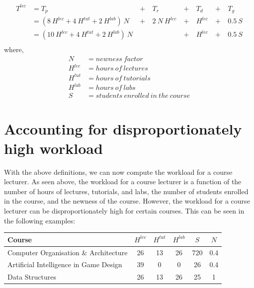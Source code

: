 \begin{equation}
  \begin{aligned}
    T^{lec} & = T_p                                        & \ +\  & T_r            & \ +\  & T_d     & \ +\  & T_g    \\
            & = (8\ H^{lec} + 4\ H^{tut} + 2\ H^{lab})\ N  & \ +\  & 2\ N\  H^{lec} & \ +\  & H^{lec} & \ +\  & 0.5\ S \\
            & = (10\ H^{lec} + 4\ H^{tut} + 2\ H^{lab})\ N &       &                & \ +\  & H^{lec} & \ +\  & 0.5\ S \\
  \end{aligned}
\end{equation}
where,
\begin{equation*}
  \begin{aligned}
    N       & = newness\ factor                     \\
    H^{lec} & = hours\ of\ lectures                 \\
    H^{tut} & = hours\ of\ tutorials                \\
    H^{lab} & = hours\ of\ labs                     \\
    S       & = students\ enrolled\ in\ the\ course
  \end{aligned}
\end{equation*}

\section{Accounting for disproportionately high workload}

With the above definitions, we can now compute the workload for a course lecturer. As seen above, the workload for a course lecturer is a function of the number of hours of lectures, tutorials, and labs, the number of students enrolled in the course, and the newness of the course. However, the workload for a course lecturer can be disproportionately high for certain courses. This can be seen in the following examples:

\begin{table}[ht]
  \centering
  \begin{tabular}{|l|c|c|c|c|c|}
    \hline
    \textbf{Course}                        & \(H^{lec}\) & \(H^{tut}\) & \(H^{lab}\) & \(S\) & \(N\) \\\hline
    Computer Organisation \& Architecture  & 26          & 13          & 26          & 720   & 0.4   \\\hline
    Artificial Intelligence in Game Design & 39          & 0           & 0           & 26    & 0.4   \\\hline
    Data Structures                        & 26          & 13          & 26          & 25    & 1     \\\hline
  \end{tabular}
\end{table}

